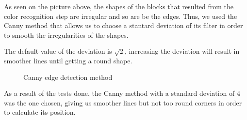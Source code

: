 As seen on the picture above, the shapes of the blocks that resulted from the color recognition step are irregular and so are be the edges. Thus, we used the Canny method that allows us to choose a stantard deviation of its filter in order to smooth the irregularities of the shapes.\par 



The default value of the deviation is $\sqrt{2}$, increasing the deviation will result in smoother lines until getting a round shape.

\begin{figure}[H]
\hfill
{}
\hfill
{}
\hfill
{}
\hfill
{}
\hfill

\caption{Canny edge detection method}

\end{figure}




As a result of the tests done, the Canny method with a standard deviation of 4 was the one chosen, giving us smoother lines but not too round corners in order to calculate its position.



 